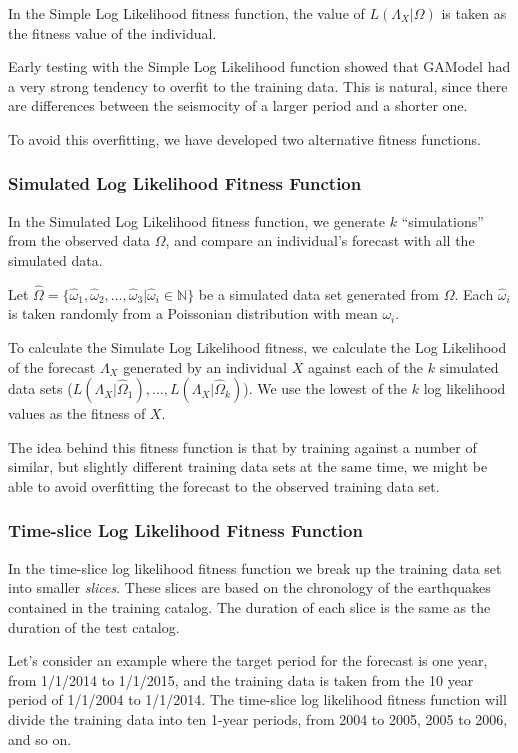 \documentclass{sig-alternate}
\begin{document}
In the Simple Log Likelihood fitness function, the value of
$L(\Lambda_X|\Omega)$ is taken as the fitness value of the individual.

Early testing with the Simple Log Likelihood function showed that
GAModel had a very strong tendency to overfit to the training
data. This is natural, since there are differences between the
seismocity of a larger period and a shorter one. 

To avoid this overfitting, we have developed two alternative fitness
functions.

\subsubsection{Simulated Log Likelihood Fitness Function} %

In the Simulated Log Likelihood fitness function, we generate $k$
``simulations'' from the observed data $\Omega$, and compare an
individual's forecast with all the simulated data.

Let $\hat\Omega =
\{\hat\omega_1,\hat\omega_2,\dots,\hat\omega_3
|\hat\omega_i\in\mathbb{N}\}$ be a simulated data set generated from
$\Omega$. Each $\hat\omega_i$ is taken randomly from a Poissonian
distribution with mean $\omega_i$.

To calculate the Simulate Log Likelihood fitness, we calculate the Log
Likelihood of the forecast $\Lambda_X$ generated by an individual $X$
against each of the $k$ simulated data sets
($L(\Lambda_X|\hat\Omega_1), \dots, L(\Lambda_X|\hat\Omega_k)$). We
use the lowest of the $k$ log likelihood values as the fitness of $X$.

The idea behind this fitness function is that by training against a
number of similar, but slightly different training data sets at the
same time, we might be able to avoid overfitting the forecast to the
observed training data set.

\subsubsection{Time-slice Log Likelihood Fitness Function} %

In the time-slice log likelihood fitness function we break up the
training data set into smaller \emph{slices}. These slices are based
on the chronology of the earthquakes contained in the training
catalog. The duration of each slice is the same as the duration of the
test catalog.

Let's consider an example where the target period for the forecast is
one year, from 1/1/2014 to 1/1/2015, and the training data is taken
from the 10 year period of 1/1/2004 to 1/1/2014. The time-slice log
likelihood fitness function will divide the training data into ten
1-year periods, from 2004 to 2005, 2005 to 2006, and so on. 
\end{document}
